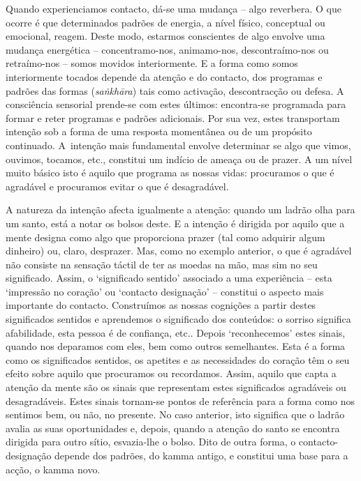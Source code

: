 Quando experienciamos contacto, dá-se uma mudança -- algo reverbera. O que
ocorre é que determinados padrões de energia, a nível físico, conceptual ou
emocional, reagem. Deste modo, estarmos conscientes de algo envolve uma mudança
energética -- concentramo-nos, animamo-nos, descontraímo-nos ou retraímo-nos --
somos movidos interiormente. E a forma como somos interiormente tocados depende
da atenção e do contacto, dos programas e padrões das formas (\emph{saṅkhāra})
tais como activação, descontracção ou defesa. A consciência sensorial prende-se
com estes últimos: encontra-se programada para formar e reter programas e
padrões adicionais. Por sua vez, estes transportam intenção sob a forma de uma
resposta momentânea ou de um propósito continuado. A~intenção mais fundamental
envolve determinar se algo que vimos, ouvimos, tocamos, etc., constitui um
indício de ameaça ou de prazer. A um nível muito básico isto é aquilo que
programa as nossas vidas: procuramos o que é agradável e procuramos evitar o que
é desagradável.

A natureza da intenção afecta igualmente a atenção: quando um ladrão olha para
um santo, está a notar os bolsos deste. E a intenção é dirigida por aquilo que a
mente designa como algo que proporciona prazer (tal como adquirir algum
dinheiro) ou, claro, desprazer. Mas, como no exemplo anterior, o que é agradável
não consiste na sensação táctil de ter as moedas na mão, mas sim no seu
significado. Assim, o `significado sentido' associado a uma experiência -- esta
`impressão no coração' ou `contacto designação' -- constitui o aspecto mais
importante do contacto. Construímos as nossas cognições a partir destes
significados sentidos e aprendemos o significado dos conteúdos: o sorriso
significa afabilidade, esta pessoa é de confiança, etc.. Depois `reconhecemos'
estes sinais, quando nos deparamos com eles, bem como outros semelhantes. Esta é
a forma como os significados sentidos, os apetites e as necessidades do coração
têm o seu efeito sobre aquilo que procuramos ou recordamos. Assim, aquilo que
capta a atenção da mente são os sinais que representam estes significados
agradáveis ou desagradáveis. Estes sinais tornam-se pontos de referência para a
forma como nos sentimos bem, ou não, no presente. No caso anterior, isto
significa que o ladrão avalia as suas oportunidades e, depois, quando a atenção
do santo se encontra dirigida para outro sítio, esvazia-lhe o bolso. Dito de
outra forma, o contacto-designação depende dos padrões, do kamma antigo, e
constitui uma base para a acção, o kamma novo.


